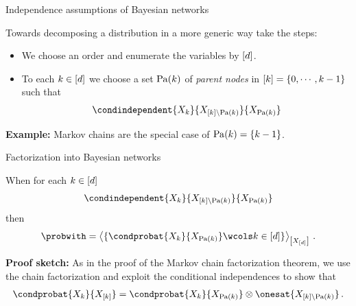 \documentclass{beamer}
\begin{document}
    \begin{frame}{Independence assumptions of Bayesian networks}


        Towards decomposing a distribution in a more generic way take the steps:
        \begin{itemize}
            \item We choose an order and enumerate the variables by $[d]$.
            \item To each $k\in[d]$ we choose a set $\mathrm{Pa}(k)$ of \emph{parent nodes} in $[k]=\{0,\cdots,k-1\}$ such that
            \begin{align*}
                \condindependent{\catvariableof{\catenumerator}}{\catvariableof{[\catenumerator]\backslash\parentsof{\catenumerator}}}{\catvariableof{\parentsof{\catenumerator}}}
            \end{align*}
        \end{itemize}

            {\bf Example:} Markov chains are the special case of $\mathrm{Pa}(k)=\{k-1\}$.
    \end{frame}


    \begin{frame}{Factorization into Bayesian networks}

        \begin{theorem}
            When for each $k\in[d]$
            \begin{align*}
                \condindependent{\catvariableof{\catenumerator}}{\catvariableof{[\catenumerator]\backslash\parentsof{\catenumerator}}}{\catvariableof{\parentsof{\catenumerator}}}
            \end{align*}
            then
            \begin{align*}
                \probwith =
                \contractionof{\{\condprobat{\catvariableof{\catenumerator}}{\catvariableof{\parentsof{\catenumerator}}} \wcols \catenumeratorin\}}{
                    \shortcatvariables
                } \, .
            \end{align*}
        \end{theorem}
            {\bf Proof sketch:} As in the proof of the Markov chain factorization theorem, we use the chain factorization and exploit the conditional independences to show that
        \begin{align*}
            \condprobat{\catvariableof{\catenumerator}}{\catvariableof{[\catenumerator]}}
            = \condprobat{\catvariableof{\catenumerator}}{\catvariableof{\parentsof{\catenumerator}}} \otimes \onesat{\catvariableof{[\catenumerator]\backslash\parentsof{\catenumerator}}} \, .
        \end{align*}

    \end{frame}
\end{document}
